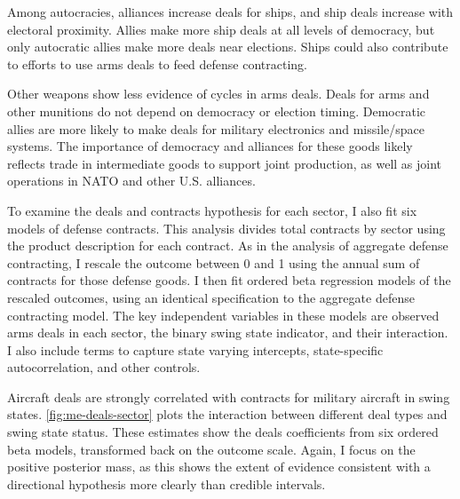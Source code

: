 \documentclass[12pt]{article}
\begin{document}
Among autocracies, alliances increase deals for ships, and ship deals increase with electoral proximity. 
Allies make more ship deals at all levels of democracy, but only autocratic allies make more deals near elections. 
Ships could also contribute to efforts to use arms deals to feed defense contracting. 


Other weapons show less evidence of cycles in arms deals. 
Deals for arms and other munitions do not depend on democracy or election timing. 
Democratic allies are more likely to make deals for military electronics and missile/space systems. 
The importance of democracy and alliances for these goods likely reflects trade in intermediate goods to support joint production, as well as joint operations in NATO and other U.S. alliances. 




To examine the deals and contracts hypothesis for each sector, I also fit six models of defense contracts. 
This analysis divides total contracts by sector using the product description for each contract. 
As in the analysis of aggregate defense contracting, I rescale the outcome between 0 and 1 using the annual sum of contracts for those defense goods. 
I then fit ordered beta regression models of the rescaled outcomes, using an identical specification to the aggregate defense contracting model.
The key independent variables in these models are observed arms deals in each sector, the binary swing state indicator, and their interaction. 
I also include terms to capture state varying intercepts, state-specific autocorrelation, and other controls. 


Aircraft deals are strongly correlated with contracts for military aircraft in swing states. 
\autoref{fig:me-deals-sector} plots the interaction between different deal types and swing state status.  
These estimates show the deals coefficients from six ordered beta models, transformed back on the outcome scale. 
Again, I focus on the positive posterior mass, as this shows the extent of evidence consistent with a directional hypothesis more clearly than credible intervals.
\end{document}
